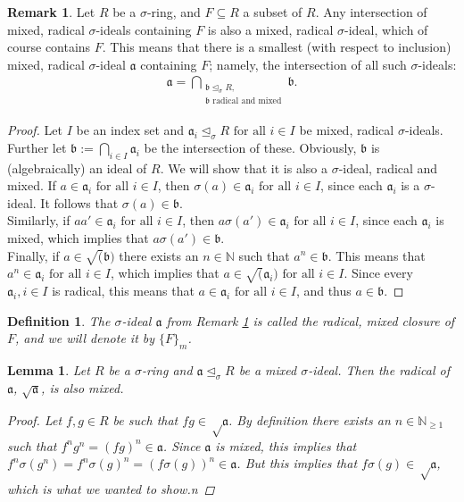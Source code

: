 \documentclass{article}
\def\NE{\mathbb{N}_{\geq1}}
\def\N{\mathbb{N}}
\def\a{\mathfrak{a}}
\def\b{\mathfrak{b}}
\def\s{\sigma}
\def\si{\unlhd_{\sigma}}
\def\fa{\text{ for all }}
\newenvironment{bew}{\begin{proof}[Proof]}{\end{proof}}
\theoremstyle{plain}
\newtheorem{lem}[Satz]{Lemma}
\newtheorem{defn}[Satz]{Definition}
\theoremstyle{definition}
\newtheorem{rem}[Satz]{Remark}
\begin{document}
\begin{rem}\label{wmwelldef}
Let $R$ be a $\s$-ring, and $F \subseteq R$ a subset of $R$. Any intersection of mixed, radical $\s$-ideals containing $F$ is also a mixed, radical $\s$-ideal, which of course contains $F$. 
This means that there is a smallest (with respect to inclusion) mixed, radical $\s$-ideal $\a$ containing $F$; namely, the intersection of all such $\s$-ideals:
\begin{align*} \a = \bigcap_{\substack{ \b \si R, \\ \b \text{ radical and mixed}}} \b. \end{align*}
\begin{proof}
Let $I$ be an index set and $\a_i \si R \fa i \in I$ be mixed, radical $\s$-ideals. Further let $\b := \bigcap_{i \in I} \a_i$ be the intersection of these. Obviously, $\b$ is (algebraically) an ideal of $R$. We will show that it is also a $\s$-ideal, radical and mixed.
If $a \in \a_i \fa i \in I$, then $\s(a) \in \a_i \fa i \in I$, since each $\a_i$ is a $\s$-ideal.
It follows that $\s(a) \in \b$. \\
\indent Similarly, if $aa' \in \a_i \fa i \in I$, then $a \s(a') \in \a_i \fa i \in I$, since each $\a_i$ is mixed, which implies that $a \s(a') \in \b$.  \\
\indent Finally, if $a \in \sqrt(\b)$ there exists an $n \in \N$ such that $a^n \in \b$. This means that $a^n \in \a_i \fa i \in I$, which implies that $a \in \sqrt(\a_i) \fa i \in I$. Since every $\a_i, i \in I$ is radical, this means that $a \in \a_i \fa i \in I$,
and thus $a \in \b$.
\end{proof}
\end{rem}

\begin{defn}
The $\s$-ideal $\a$ from Remark \ref{wmwelldef} is called the radical, mixed closure of $F$, and we will denote it by $\{F\}_{m}$.
\end{defn}


\begin{lem}\label{sqrtmixed}
Let $R$ be a $\s$-ring and $\a \si R$ be a mixed $\s$-ideal. Then the radical of $\a$, $\sqrt{\a}$, is also mixed.
\begin{bew}
Let $f,g \in R$ be such that $fg \in \sqrt \a$. By definition there exists an $n \in \NE$ such that $f^n g^n = (fg)^n \in \a$. Since $\a$ is mixed, this implies that $f^n \s(g^n) = f^n \s(g)^n = (f\s(g))^n \in \a$. 
But this implies that $f\s(g) \in \sqrt \a$, which is what we wanted to show.n
\end{bew}
\end{lem}
\end{document}
